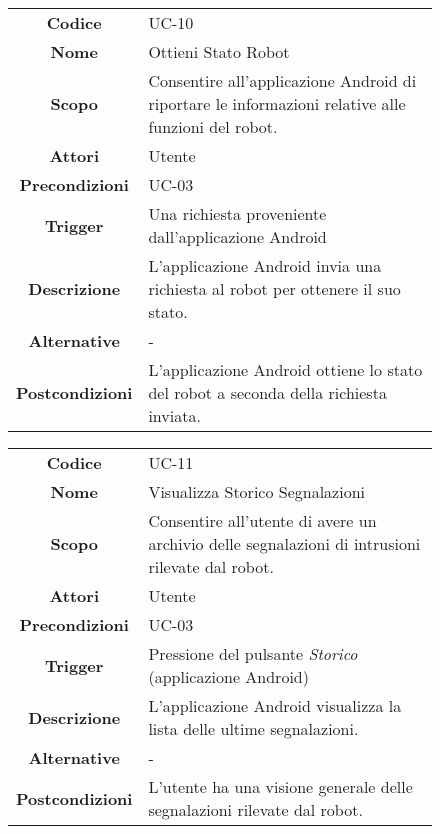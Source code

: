 \documentclass[]{article}
\begin{document}
\begin{figure}[htbp]
\centering
\begin{tabular}{|c|l|}
\hline

\textbf{Codice}
 & 
UC-10
\\

\textbf{Nome}
 & 
Ottieni Stato Robot
\\

\textbf{Scopo}
 & 
Consentire all'applicazione Android di riportare le informazioni
relative alle funzioni del robot.
\\

\textbf{Attori}
 & 
Utente
\\

\textbf{Precondizioni}
 & 
UC-03
\\

\textbf{Trigger}
 & 
Una richiesta proveniente dall'applicazione Android
\\

\textbf{Descrizione}
 & 
L'applicazione Android invia una richiesta al robot per ottenere il suo
stato.
\\

\textbf{Alternative}
 & 
-
\\

\textbf{Postcondizioni}
 & 
L'applicazione Android ottiene lo stato del robot a seconda della
richiesta inviata.
\\
\hline
\end{tabular}
\end{figure}

\begin{figure}[htbp]
\centering
\begin{tabular}{|c|l|}
\hline

\textbf{Codice}
 & 
UC-11
\\

\textbf{Nome}
 & 
Visualizza Storico Segnalazioni
\\

\textbf{Scopo}
 & 
Consentire all'utente di avere un archivio delle segnalazioni di
intrusioni rilevate dal robot.
\\

\textbf{Attori}
 & 
Utente
\\

\textbf{Precondizioni}
 & 
UC-03
\\

\textbf{Trigger}
 & 
Pressione del pulsante \emph{Storico} (applicazione Android)
\\

\textbf{Descrizione}
 & 
L'applicazione Android visualizza la lista delle ultime
segnalazioni.
\\

\textbf{Alternative}
 & 
-
\\

\textbf{Postcondizioni}
 & 
L'utente ha una visione generale delle segnalazioni rilevate dal
robot.
\\
\hline
\end{tabular}
\end{figure}
\end{document}
